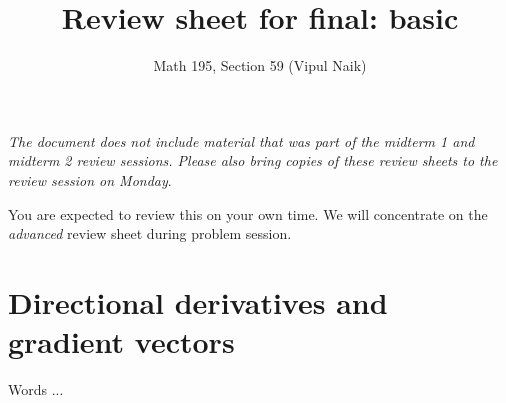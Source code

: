 \documentclass[10pt]{amsart}
\title{Review sheet for final: basic}
\author{Math 195, Section 59 (Vipul Naik)}
\begin{document}
\maketitle

{\em The document does not include material that was part of the
midterm 1 and midterm 2 review sessions. Please also bring copies of
these review sheets to the review session on Monday}.

You are expected to review this on your own time. We will concentrate
on the {\em advanced} review sheet during problem session.

\section{Directional derivatives and gradient vectors}

Words ...
\end{document}
